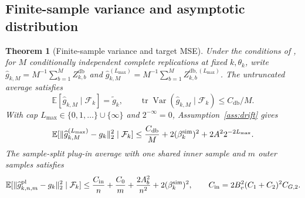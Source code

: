 \documentclass[11pt]{article}
\newtheorem{theorem}{Theorem}[section]
\newcommand{\E}{\mathbb E}
\newcommand{\Var}{\operatorname{Var}}
\newcommand{\1}{\mathbf 1}
\newcommand{\tr}{\operatorname{tr}}
\DeclarePairedDelimiter{\norm}{\lVert}{\rVert}
\newcommand{\cF}{\mathcal F}
\newcommand{\db}{\mathrm{db}}
\newcommand{\pl}{\mathrm{pl}}
\begin{document}
\subsection{Finite-sample variance and asymptotic distribution}
\begin{theorem}[Finite-sample variance and target MSE]\label{thm:variance}
Under the conditions of , for $M$ conditionally independent complete replications at fixed $k,\theta_k$, write $\widehat g_{k,M}=M^{-1}\sum_{b=1}^M Z_{k,b}^{\db}$ and $\widehat g_{k,M}^{(L_{\max})}=M^{-1}\sum_{b=1}^M Z_{k,b}^{\db,(L_{\max})}$. The untruncated average satisfies
\begin{equation}\label{eq:variance-bound}
 \E[\widehat g_{k,M}\mid\cF_k]=\widetilde g_k,
 \qquad \tr\Var(\widehat g_{k,M}\mid\cF_k)\le C_{\db}/M.
\end{equation}
With cap $L_{\max}\in\{0,1,\ldots\}\cup\{\infty\}$ and $2^{-\infty}=0$, Assumption~\ref{ass:drift} gives
\begin{equation}\label{eq:total-mse}
 \E[\norm{\widehat g_{k,M}^{(L_{\max})}-g_k}_2^2\mid\cF_k]
 \le \frac{C_{\db}}M+2(\beta_k^{\rm sim})^2+2A^22^{-2L_{\max}}.
\end{equation}
The sample-split plug-in average with one shared inner sample and $m$ outer samples satisfies
\begin{equation}\label{eq:plugin-mse}
 \E[\norm{\widehat g_{k,n,m}^{\pl}-g_k}_2^2\mid\cF_k]
 \le\frac{C_{\rm in}}{n}+\frac{C_0}{m}+\frac{2A_b^2}{n^2}
 +2(\beta_k^{\rm sim})^2,
 \qquad C_{\rm in}=2B_v^2(C_1+C_2)^2C_{G,2}.
\end{equation}
\end{theorem}
\end{document}

